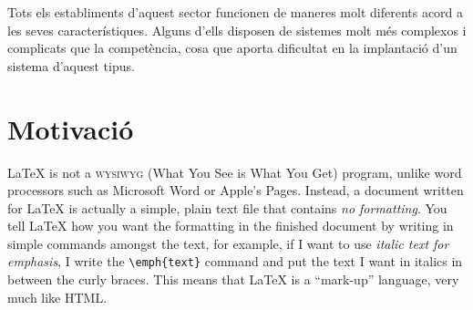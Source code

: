 Tots els establiments d’aquest sector funcionen de maneres molt diferents acord a les seves característiques. Alguns d’ells disposen de sistemes molt més complexos i complicats que la competència, cosa que aporta dificultat en la implantació d’un sistema d’aquest tipus.


\section{Motivació}

\LaTeX{} is not a \textsc{wysiwyg} (What You See is What You Get) program, unlike word processors such as Microsoft Word or Apple's Pages. Instead, a document written for \LaTeX{} is actually a simple, plain text file that contains \emph{no formatting}. You tell \LaTeX{} how you want the formatting in the finished document by writing in simple commands amongst the text, for example, if I want to use \emph{italic text for emphasis}, I write the \verb|\emph{text}| command and put the text I want in italics in between the curly braces. This means that \LaTeX{} is a \enquote{mark-up} language, very much like HTML.
